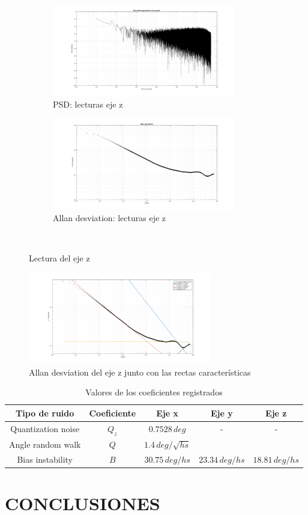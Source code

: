\documentclass[a4paper,11pt,twoside]{IT-CNEA}
\begin{document}
\begin{figure}[t!]
    \centering
    \begin{subfigure}[t]{0.5\textwidth}
        \centering
        \includegraphics[width=8cm]{Figuras/PSDGyroz.png}
        \caption{PSD: lecturas eje z}
        \label{fig:}
    \end{subfigure}%
    \begin{subfigure}[t]{0.5\textwidth}
        \centering
        \includegraphics[width=8cm]{Figuras/AllanGyroz.png}
        \caption{Allan desviation: lecturas eje z}
        \label{fig:}
    \end{subfigure}%
    ~ 
    \caption{Lectura del eje z}
    \label{fig:lecturasEjez}
\end{figure}
\begin{figure}[h!]
\centering
\includegraphics[width=8cm]{Figuras/AllanGyrozRectas.png}
\caption{Allan desviation del eje z junto con las rectas características}
\label{fig:lecturaEjezRectas}
\end{figure}
\begin{table}[h!]
\centering
\caption{Valores de los coeficientes registrados}
\label{tabla:valoresCoeficientesEjes}
\begin{tabular}{|c|c|c|c|c|}
\hline
Tipo de ruido&Coeficiente& Eje x & Eje y & Eje z \\ \hline
Quantization noise&$Q_z$&$0.7528\,deg$&-&- \\ \hline
Angle random walk&$Q$&$1.4\,deg/\sqrt{hs}$& & \\ \hline
Bias instability&$B$&$30.75\,deg/hs$ &$23.34\,deg/hs$ &$18.81\,deg/hs$\\ \hline
\end{tabular}
\end{table}
\clearpage
\newpage
\section{CONCLUSIONES}
\clearpage
\newpage


\end{document}
